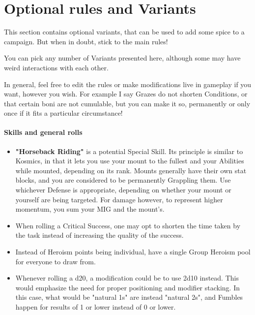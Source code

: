 	

\section{Optional rules and Variants}

This section contains optional variants, that can be used to add some spice to a campaign. But when in doubt, stick to the main rules!

You can pick any number of Variants presented here, although some may have weird interactions with each other.

\begin{rpg-examplebox}
    In general, feel free to edit the rules or make modifications live in gameplay if you want, however you wish. For example I say Grazes do not shorten Conditions, or that certain boni are not cumulable, but you can make it so, permanently or only once if it fits a particular circumstance!
\end{rpg-examplebox}


\paragraph{Skills and general rolls}

\begin{itemize}
    \item \textbf{"Horseback Riding"} is a potential Special Skill. Its principle is similar to Kosmics, in that it lets you use your mount to the fullest and your Abilities while mounted, depending on its rank. Mounts generally have their own stat blocks, and you are considered to be permanently Grappling them. Use whichever Defense is appropriate, depending on whether your mount or yourself are being targeted. For damage however, to represent higher momentum, you sum your MIG and the mount's.
    \item When rolling a Critical Success, one may opt to shorten the time taken by the task instead of increasing the quality of the success.
    \item Instead of Heroism points being individual, have a single Group Heroism pool for everyone to draw from.
    \item Whenever rolling a d20, a modification could be to use 2d10 instead. This would emphasize the need for proper positioning and modifier stacking. In this case, what would be "natural 1s" are instead "natural 2s", and Fumbles happen for results of 1 or lower instead of 0 or lower.
\end{itemize}

